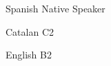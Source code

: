 
\begin{cvskills}

  \cvskill
    {Spanish} %
    {Native Speaker}

  \cvskill
    {Catalan} %
    {C2} %

  \cvskill
    {English} %
    {B2} %

\end{cvskills}

